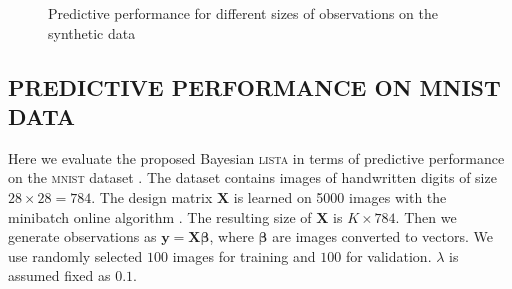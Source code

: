 \documentclass[letterpaper]{article}
\begin{document}
\begin{figure}[t]
\centering
\caption{Predictive performance for different sizes of observations on the synthetic data}
\label{fig:unsersampling_synthetic}
\end{figure}



\subsection{\uppercase{Predictive performance on mnist data}}
Here we evaluate the proposed Bayesian \textsc{lista} in terms of predictive performance on the \textsc{mnist} dataset \citep{lecun1998gradient}. The dataset contains images of handwritten digits of size $28 \times 28 = 784$. The design matrix $\mathbf{X}$ is learned on 5000 images with the minibatch online algorithm \citep{mairal2009online}. The resulting size of $\mathbf{X}$ is $K \times 784$. Then we generate observations as $\mathbf{y} = \mathbf{X}\boldsymbol\beta$, where $\boldsymbol\beta$ are images converted to vectors. We use randomly selected $100$ images for training and $100$ for validation. $\lambda$ is assumed fixed as $0.1$.
\end{document}

